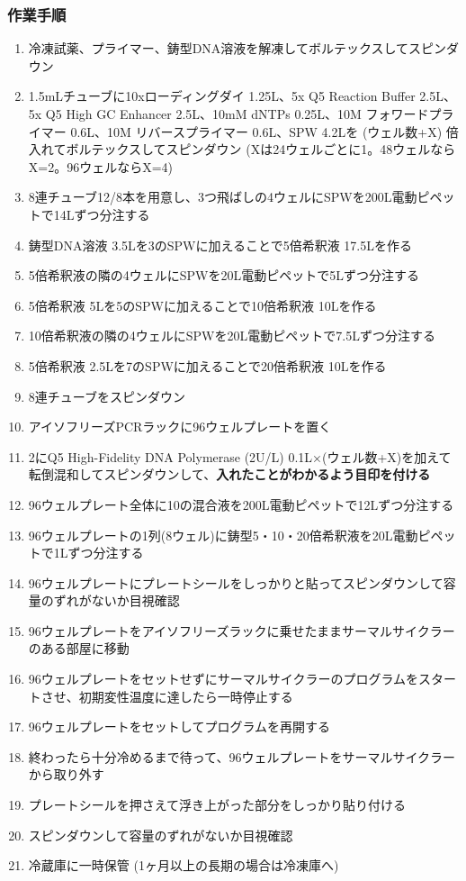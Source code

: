\documentclass[titlepage,10pt,a4paper,uplatex]{jsbook}
\renewcommand{\textbf}[1]{{\bfseries\sffamily#1}}
\begin{document}
\subsubsection{作業手順}
\begin{enumerate}
\item 冷凍試薬、プライマー、鋳型DNA溶液を解凍してボルテックスしてスピンダウン
\item 1.5mLチューブに10xローディングダイ 1.25{\textmu}L、5x Q5 Reaction Buffer 2.5{\textmu}L、5x Q5 High GC Enhancer 2.5{\textmu}L、10mM dNTPs 0.25{\textmu}L、10{\textmu}M フォワードプライマー 0.6{\textmu}L、10{\textmu}M リバースプライマー 0.6{\textmu}L、SPW 4.2{\textmu}Lを (ウェル数+X) 倍入れてボルテックスしてスピンダウン (Xは24ウェルごとに1。48ウェルならX=2。96ウェルならX=4)
\item 8連チューブ12/8本を用意し、3つ飛ばしの4ウェルにSPWを200{\textmu}L電動ピペットで14{\textmu}Lずつ分注する
\item 鋳型DNA溶液 3.5{\textmu}Lを3のSPWに加えることで5倍希釈液 17.5{\textmu}Lを作る
\item 5倍希釈液の隣の4ウェルにSPWを20{\textmu}L電動ピペットで5{\textmu}Lずつ分注する
\item 5倍希釈液 5{\textmu}Lを5のSPWに加えることで10倍希釈液 10{\textmu}Lを作る
\item 10倍希釈液の隣の4ウェルにSPWを20{\textmu}L電動ピペットで7.5{\textmu}Lずつ分注する
\item 5倍希釈液 2.5{\textmu}Lを7のSPWに加えることで20倍希釈液 10{\textmu}Lを作る
\item 8連チューブをスピンダウン
\item アイソフリーズPCRラックに96ウェルプレートを置く
\item 2にQ5 High-Fidelity DNA Polymerase (2U/{\textmu}L) 0.1{\textmu}L×(ウェル数+X)を加えて転倒混和してスピンダウンして、\textbf{入れたことがわかるよう目印を付ける}
\item 96ウェルプレート全体に10の混合液を200{\textmu}L電動ピペットで12{\textmu}Lずつ分注する
\item 96ウェルプレートの1列(8ウェル)に鋳型5・10・20倍希釈液を20{\textmu}L電動ピペットで1{\textmu}Lずつ分注する
\item 96ウェルプレートにプレートシールをしっかりと貼ってスピンダウンして容量のずれがないか目視確認
\item 96ウェルプレートをアイソフリーズラックに乗せたままサーマルサイクラーのある部屋に移動
\item 96ウェルプレートをセットせずにサーマルサイクラーのプログラムをスタートさせ、初期変性温度に達したら一時停止する
\item 96ウェルプレートをセットしてプログラムを再開する
\item 終わったら十分冷めるまで待って、96ウェルプレートをサーマルサイクラーから取り外す
\item プレートシールを押さえて浮き上がった部分をしっかり貼り付ける
\item スピンダウンして容量のずれがないか目視確認
\item 冷蔵庫に一時保管 (1ヶ月以上の長期の場合は冷凍庫へ)
\end{enumerate}
\end{document}

